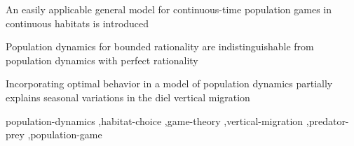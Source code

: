 \documentclass[preprint]{elsarticle}
\begin{document}
\begin{comment}
\begin{abstract}
  Population dynamics are often modeled without taking behavior into account. This is  in spite of the largest daily feeding times for predators, namely at dawn and dusk, being driven by behavior. The daily pattern stems from the Diel Vertical Migration (DVM) in the aquatic setting and crepuscular behavior in the terrestrial setting. This is usually explained by prey avoiding visual predators, and visual predators seeking to find prey. We develop a game-theoretical model of predator-prey interactions in continuous time and space, finding the Nash equilibrium at every instant. By unifying results for the general resolution of polymatrix games, and a spectral discretization scheme, we can resolve the spatially continuous game nearly instantaneously. Our approach allows a unified model for the slow time-scale of population dynamics, and the fast time-scale of the vertical migration, under seasonal changes. We use the diel vertical migration as a case, examining emergent phenomena from the introduction of the fast dynamics.
  On the behavioral time-scale, we see the emergence of a deep scattering layer from the game dynamics. On the longer time-scale of population dynamics, the introduction of optimal behavior has a strong stabilizing effect, compared to the model without optimal behavior. In a changing seasonal environment, we observe a change in daily migration patterns throughout the seasons, driven by changes in both population and light levels. The framework we propose can easily be adapted to population games in inhomogenous terrestrial environments, and more complex food-webs.
\end{abstract}
\end{comment}
\begin{highlights}\item An easily applicable general model for continuous-time population games in continuous habitats is introduced \item Population dynamics for bounded rationality are indistinguishable from population dynamics with perfect rationality \item Incorporating optimal behavior in a model of population dynamics partially explains seasonal variations in the diel vertical migration \end{highlights}

\begin{keyword} population-dynamics \sep habitat-choice \sep game-theory \sep vertical-migration \sep predator-prey \sep population-game %
\end{keyword}
\end{document}
